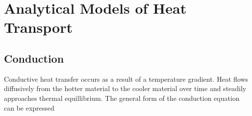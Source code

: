 {%











\section{Analytical Models of Heat Transport} \label{sec:analytical_heat}

\subsection{Conduction}

Conductive heat transfer occurs as a result of a temperature gradient. Heat 
flows diffusively from the hotter material to the cooler material over time and
steadily approaches thermal equillibrium. The general form of the conduction 
equation can be expressed

}
